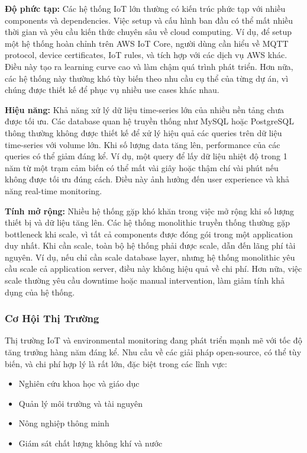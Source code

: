 \textbf{Độ phức tạp:} Các hệ thống IoT lớn thường có kiến trúc phức tạp với nhiều components và dependencies. Việc setup và cấu hình ban đầu có thể mất nhiều thời gian và yêu cầu kiến thức chuyên sâu về cloud computing. Ví dụ, để setup một hệ thống hoàn chỉnh trên AWS IoT Core, người dùng cần hiểu về MQTT protocol, device certificates, IoT rules, và tích hợp với các dịch vụ AWS khác. Điều này tạo ra learning curve cao và làm chậm quá trình phát triển. Hơn nữa, các hệ thống này thường khó tùy biến theo nhu cầu cụ thể của từng dự án, vì chúng được thiết kế để phục vụ nhiều use cases khác nhau.

\textbf{Hiệu năng:} Khả năng xử lý dữ liệu time-series lớn của nhiều nền tảng chưa được tối ưu. Các database quan hệ truyền thống như MySQL hoặc PostgreSQL thông thường không được thiết kế để xử lý hiệu quả các queries trên dữ liệu time-series với volume lớn. Khi số lượng data tăng lên, performance của các queries có thể giảm đáng kể. Ví dụ, một query để lấy dữ liệu nhiệt độ trong 1 năm từ một trạm cảm biến có thể mất vài giây hoặc thậm chí vài phút nếu không được tối ưu đúng cách. Điều này ảnh hưởng đến user experience và khả năng real-time monitoring.

\textbf{Tính mở rộng:} Nhiều hệ thống gặp khó khăn trong việc mở rộng khi số lượng thiết bị và dữ liệu tăng lên. Các hệ thống monolithic truyền thống thường gặp bottleneck khi scale, vì tất cả components được đóng gói trong một application duy nhất. Khi cần scale, toàn bộ hệ thống phải được scale, dẫn đến lãng phí tài nguyên. Ví dụ, nếu chỉ cần scale database layer, nhưng hệ thống monolithic yêu cầu scale cả application server, điều này không hiệu quả về chi phí. Hơn nữa, việc scale thường yêu cầu downtime hoặc manual intervention, làm giảm tính khả dụng của hệ thống.

\subsubsection{Cơ Hội Thị Trường}

Thị trường IoT và environmental monitoring đang phát triển mạnh mẽ với tốc độ tăng trưởng hàng năm đáng kể. Nhu cầu về các giải pháp open-source, có thể tùy biến, và chi phí hợp lý là rất lớn, đặc biệt trong các lĩnh vực:

\begin{itemize}
    \item Nghiên cứu khoa học và giáo dục
    \item Quản lý môi trường và tài nguyên
    \item Nông nghiệp thông minh
    \item Giám sát chất lượng không khí và nước
\end{itemize}

